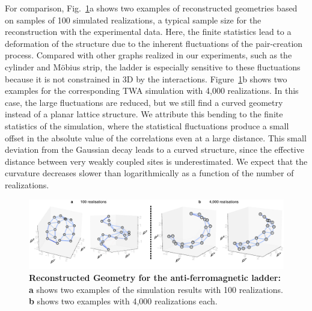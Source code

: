 \begin{bibunit}
For comparison, Fig.~\ref{Fig:SuppAFM_Ladder}a shows two examples of reconstructed geometries based on samples of 100 simulated realizations, a typical sample size for the reconstruction with the experimental data. Here, the finite statistics lead to a deformation of the structure due to the inherent fluctuations of the pair-creation process.  Compared with other graphs realized in our experiments, such as the cylinder and M\"{o}bius strip, the ladder is especially sensitive to these fluctuations because it is not constrained in 3D by the interactions.
Figure~\ref{Fig:SuppAFM_Ladder}b shows two examples for the corresponding TWA simulation with 4,000 realizations. In this case, the large fluctuations are reduced, but we still find a curved geometry instead of a planar lattice structure.  We attribute this bending to the finite statistics of the simulation, where the statistical fluctuations produce a small offset in the absolute value of the correlations even at a large distance. This small deviation from the Gaussian decay leads to a curved structure, since the effective distance between very weakly coupled sites is underestimated. We expect that the curvature decreases slower than logarithmically as a function of the number of realizations.

\begin{figure}
    \centering
    \includegraphics[width=\textwidth]{Figures/Supplement1.pdf}
    \caption{\textbf{Reconstructed Geometry for the anti-ferromagnetic ladder:} \textbf{a} shows two examples of the simulation results with 100 realizations. \textbf{b} shows two examples with 4,000 realizations each.}
    \label{Fig:SuppAFM_Ladder}
\end{figure}

\end{bibunit}
